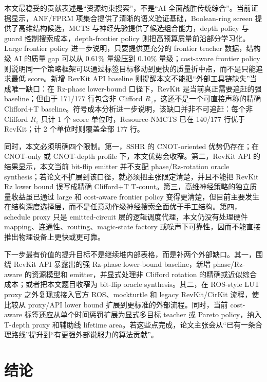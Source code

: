 \documentclass[UTF8,fontset=macnew,11pt]{ctexart}
\newcommand{\method}{Resource-NMCTS}
\newcommand{\screen}{Boolean-ring screen}
\newcommand{\anf}{\ensuremath{\mathrm{ANF}}}
\newcommand{\fprm}{\ensuremath{\mathrm{FPRM}}}
\newcommand{\mcts}{\ensuremath{\mathrm{MCTS}}}
\begin{document}
本文最稳妥的贡献表述是“资源约束搜索”，不是“AI 全面战胜传统综合”。当前证据显示，\anf{}/\fprm{} 项集合提供了清晰的语义验证基础，\screen{} 提供了高维结构候选，\mcts{} 与神经先验提供了候选组合能力，depth policy 与 guard 控制搜索成本，depth-frontier policy 则把高预算质量前沿部分学习化。Large frontier policy 进一步说明，只要提供更充分的 frontier teacher 数据，结构级 AI 的质量 gap 可以从 0.61\% 量级压到 0.10\% 量级；cost-aware frontier policy 则说明同一个策略框架可以通过标签目标移动到更快的质量折中点，而不是只能追求最低 score。新增 RevKit API baseline 则提醒本文不能把“外部工具链缺失”当成唯一缺口：在 Rz-phase lower-bound 口径下，RevKit 是当前真正需要追赶的强 baseline；但由于 171/177 行包含非 Clifford $R_z$，这还不是一个可直接声称的精确 Clifford+T baseline。符号成本分析进一步说明，该缺口并非不可追赶：每个非 Clifford $R_z$ 只计 1 个 score 单位时，\method{} 已在 140/177 行优于 RevKit；计 2 个单位时则覆盖全部 177 行。

同时，本文必须明确四个限制。第一，SSHR 的 CNOT-oriented 优势仍存在；在 CNOT-only 或 CNOT-depth profile 下，本文优势会收窄。第二，RevKit API 的结果显示，本文当前 bit-flip emitter 并不支配 phase/Rz-rotation oracle synthesis；若论文不扩展到该口径，就必须把主张限定清楚，并且不能把 RevKit Rz lower bound 误写成精确 Clifford+T T-count。第三，高维神经策略的独立质量收益虽已通过 large 和 cost-aware frontier policy 变得更清楚，但目前主要发生在结构深度选择层，而不是任意动作级神经搜索全面优于手工结构。第四，schedule proxy 只是 emitted-circuit 层的逻辑调度代理，本文仍没有处理硬件 mapping、连通性、routing、magic-state factory 或噪声下可靠性，因而不能直接推出物理设备上更快或更可靠。

下一步最有价值的提升目标不是继续堆内部表格，而是补两个外部缺口。其一，围绕 RevKit API 暴露出的强 Rz-phase lower-bound baseline，新增 phase/Rz-aware 的资源模型和 emitter，并显式处理非 Clifford rotation 的精确或近似综合成本；或者把本文题目收窄为 bit-flip oracle synthesis。其二，在 ROS-style LUT proxy 之外复现或接入官方 ROS、mockturtle 和 legacy RevKit/CirKit 流程，使比较从 proxy/API lower bound 扩展到更标准的外部流程。同时，当前 cost-aware 标签还应从单个时间惩罚扩展为显式多目标 teacher 或 Pareto policy，纳入 T-depth proxy 和辅助线 lifetime area。若这些点完成，论文主张会从“已有一条合理路线”提升到“有更强外部说服力的算法贡献”。

\section{结论}
\end{document}
